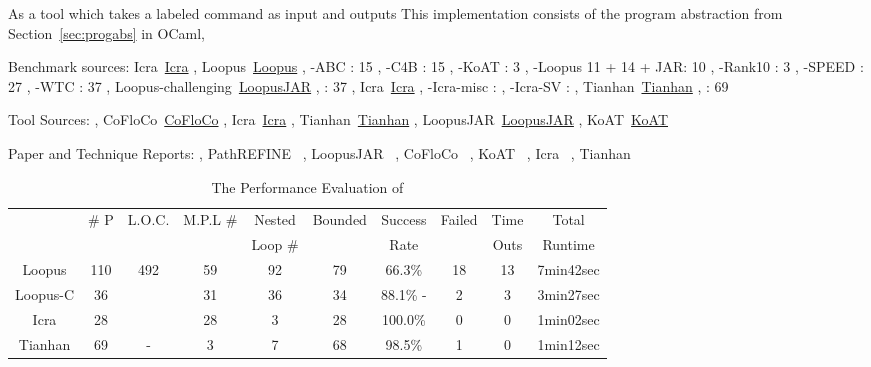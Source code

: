 As a tool which takes a labeled command as input  
and outputs 
This implementation consists of the 
program abstraction from Section~\ref{sec:progabs} in OCaml,

Benchmark sources:
Icra~\hyperlink{https://github.com/icra-team/icra}{Icra}
,
Loopus~\hyperlink{https://forsyte.at/static/people/sinn/loopusJAR/index.html}{Loopus}
,
-ABC : 15
,
-C4B : 15
,
-KoAT : 3
,
-Loopus 11 + 14 + JAR: 10
,
-Rank10 : 3
,
-SPEED : 27
,
-WTC : 37
,
Loopus-challenging~\hyperlink{https://forsyte.at/static/people/sinn/loopusJAR/index.html}{LoopusJAR}
,
: 37
,
Icra~\hyperlink{https://github.com/icra-team/icra}{Icra}
,
-Icra-misc : 
,
-Icra-SV : 
,
Tianhan~\hyperlink{https://zenodo.org/record/5140586\#.Y5pBoC-B1QI}{Tianhan}
,
: 69

Tool Sources:
,
CoFloCo~\hyperlink{https://github.com/aeflores/CoFloCo/tree/master/src}{CoFloCo}
,
Icra~\hyperlink{https://github.com/icra-team/icra}{Icra}
,
Tianhan~\hyperlink{https://zenodo.org/record/5140586\#.Y5pBoC-B1QI}{Tianhan}
,
LoopusJAR~\hyperlink{https://forsyte.at/software/loopus/}{LoopusJAR}
,
KoAT~\hyperlink{https://github.com/s-falke/kittel-koat}{KoAT}

Paper and Technique Reports:
,
PathREFINE~\cite{GulwaniJK09}
,
LoopusJAR~\cite{SinnZV17}
,
CoFloCo~\cite{Montoya17,Flores-Montoya16,Flores-MontoyaH14}
,
KoAT~\cite{BrockschmidtEFFG14,FalkeKS12,FalkeKS11}
,
Icra~\cite{KincaidBCR19,CyphertBKR19}
,
Tianhan~\cite{LuCT21}


\begin{table}[H]
    \caption{The Performance Evaluation of {\THESYSTEM}}
    \label{tb:performance-eval}
    \centering
        {\footnotesize
        \begin{tabular}{ >{\small}c | c | c | c | c | c | c | c | c | c }
        \multirow{2}{*}{Benchmark} & \multirow{2}{*}{\# P}  & \multirow{2}{*}{L.O.C.} & \multirow{2}{*}{M.P.L \#} & Nested  & \multirow{2}{*}{Bounded} & {Success} & \multirow{2}{*}{Failed} & Time  & Total\\
         &  & & & Loop \# & & Rate &  & Outs &   Runtime \\
        \hline
            Loopus & 110 & 492 & 59  & 92  & 79 & 66.3\% & 18 &  13 & 7min42sec \\
            \hline
            Loopus-C & 36 & & 31 & 36 & {34} & {88.1\% -}  & 2 & 3 & {3min27sec} \\
            \hline
            Icra & 28 & & 28 & 3 & {28} & 100.0\% & 0 & 0 & {1min02sec} \\
            \hline
            Tianhan & 69 & - & 3 & 7 & 68 & 98.5\% & 1 & 0 & 1min12sec \\
            \hline
        \end{tabular}
        }
    \end{table}


